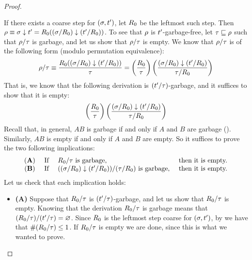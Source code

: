 \begin{proof}
\begin{itemize}
  If there exists a coarse step for $(\sigma,t')$,
  let $R_0$ be the leftmost such step.
  Then $\rho \equiv \sigma \downarrow t' = R_0((\sigma/R_0) \downarrow (t'/R_0))$.
  To see that $\rho$ is $t'$-garbage-free,
  let $\tau \sqsubseteq \rho$ such that $\rho/\tau$ is garbage,
  and let us show that $\rho/\tau$ is empty. 
  We know that $\rho/\tau$ is of the following form (modulo permutation equivalence):
  \[
     \rho/\tau \equiv
     \frac{R_0((\sigma/R_0) \downarrow (t'/R_0))}{\tau}
     =
     \left(\frac{R_0}{\tau}\right) \left(\frac{(\sigma/R_0) \downarrow (t'/R_0)}{\tau/R_0}\right)
  \]
  That is, we know that the following derivation is $(t'/\tau)$-garbage,
  and it suffices to show that it is empty:
  \[
    \left(\frac{R_0}{\tau}\right) \left(\frac{(\sigma/R_0) \downarrow (t'/R_0)}{\tau/R_0}\right)
  \]
  Recall that, in general, $AB$ is garbage if and only if $A$ and $B$ are garbage ().
  Similarly, $AB$ is empty if and only if $A$ and $B$ are empty.
  So it suffices to prove the two following implications:
  \[
    \begin{array}{clll}
    {\bf (A)} &
    \text{ If } & R_0/\tau \text{ is garbage,} & \text{ then it is empty.} \\
    {\bf (B)} &
    \text{ If } & ((\sigma/R_0) \downarrow (t'/R_0))/(\tau/R_0) \text{ is garbage,} & \text{ then it is empty.}
    \end{array}
  \]
  Let us check that each implication holds:
  \begin{itemize}
  \item {\bf (A)}
    Suppose that $R_0/\tau$ is $(t'/\tau)$-garbage,
    and let us show that $R_0/\tau$ is empty.
    Knowing that the derivation $R_0/\tau$ is garbage means that
    $(R_0/\tau)/(t'/\tau) = \varnothing$.
    Since $R_0$ is the leftmost step coarse for $(\sigma,t')$,
    by 
    we have that $\#(R_0/\tau) \leq 1$.
    If $R_0/\tau$ is empty we are done, since this is what we wanted to prove.


\end{itemize}
\end{itemize}
\end{proof}

